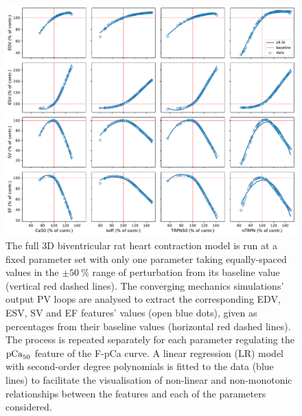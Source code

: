 \begin{figure}[h!]
    \myfloatalign
    \includegraphics[width=\textwidth]{figures/chapter08/Fig1.pdf}
    \caption{The full $3$D biventricular rat heart contraction model is run at a fixed parameter set with only one parameter taking equally-spaced values in the $\pm\SI{50}{\percent}$ range of perturbation from its baseline value (vertical red dashed lines). The converging mechanics simulations' output PV loops are analysed to extract the corresponding EDV, ESV, SV and EF features' values (open blue dots), given as percentages from their baseline values (horizontal red dashed lines). The process is repeated separately for each parameter regulating the $\textrm{pCa}_{50}$ feature of the F-pCa curve. A linear regression (LR) model with second-order degree polynomials is fitted to the data (blue lines) to facilitate the visualisation of non-linear and non-monotonic relationships between the features and each of the parameters considered.}
    \label{fig:EFvsparamsnonmonotonic}
\end{figure}

